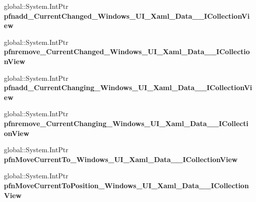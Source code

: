 \begin{DoxyCompactItemize}
global\+::\+System.\+Int\+Ptr {\bfseries pfnadd\+\_\+\+Current\+Changed\+\_\+\+Windows\+\_\+\+U\+I\+\_\+\+Xaml\+\_\+\+Data\+\_\+\+\_\+\+I\+Collection\+View}
\item 
\mbox{\label{struct_windows_1_1_u_i_1_1_xaml_1_1_data_1_1_i_collection_view_____impl_1_1_vtbl_a558b15a0729fabc9c4fe279e2e930a0f}} 
global\+::\+System.\+Int\+Ptr {\bfseries pfnremove\+\_\+\+Current\+Changed\+\_\+\+Windows\+\_\+\+U\+I\+\_\+\+Xaml\+\_\+\+Data\+\_\+\+\_\+\+I\+Collection\+View}
\item 
\mbox{\label{struct_windows_1_1_u_i_1_1_xaml_1_1_data_1_1_i_collection_view_____impl_1_1_vtbl_a7ee31490169375a537df470b06c494e7}} 
global\+::\+System.\+Int\+Ptr {\bfseries pfnadd\+\_\+\+Current\+Changing\+\_\+\+Windows\+\_\+\+U\+I\+\_\+\+Xaml\+\_\+\+Data\+\_\+\+\_\+\+I\+Collection\+View}
\item 
\mbox{\label{struct_windows_1_1_u_i_1_1_xaml_1_1_data_1_1_i_collection_view_____impl_1_1_vtbl_a145cd6cbeb66489bddb3379b4c6cf9ac}} 
global\+::\+System.\+Int\+Ptr {\bfseries pfnremove\+\_\+\+Current\+Changing\+\_\+\+Windows\+\_\+\+U\+I\+\_\+\+Xaml\+\_\+\+Data\+\_\+\+\_\+\+I\+Collection\+View}
\item 
\mbox{\label{struct_windows_1_1_u_i_1_1_xaml_1_1_data_1_1_i_collection_view_____impl_1_1_vtbl_acf3252ca329cf0aea8a0654127235b27}} 
global\+::\+System.\+Int\+Ptr {\bfseries pfn\+Move\+Current\+To\+\_\+\+Windows\+\_\+\+U\+I\+\_\+\+Xaml\+\_\+\+Data\+\_\+\+\_\+\+I\+Collection\+View}
\item 
\mbox{\label{struct_windows_1_1_u_i_1_1_xaml_1_1_data_1_1_i_collection_view_____impl_1_1_vtbl_a95ff2f8849181e7172d3b8f2338f45f8}} 
global\+::\+System.\+Int\+Ptr {\bfseries pfn\+Move\+Current\+To\+Position\+\_\+\+Windows\+\_\+\+U\+I\+\_\+\+Xaml\+\_\+\+Data\+\_\+\+\_\+\+I\+Collection\+View}
\item 
\mbox{\label{struct_windows_1_1_u_i_1_1_xaml_1_1_data_1_1_i_collection_view_____impl_1_1_vtbl_a98d8409102bd8a6193a600d5c9669870}} 

\end{DoxyCompactItemize}
